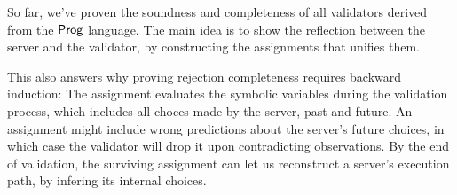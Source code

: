 So far, we've proven the soundness and completeness of all validators derived
from the $\mathsf{Prog}$ language.  The main idea is to show the reflection between the
server and the validator, by constructing the assignments that unifies them.

This also answers why proving rejection completeness requires backward
induction: The assignment evaluates the symbolic variables during the validation
process, which includes all choces made by the server, past and future.  An
assignment might include wrong predictions about the server's future choices, in
which case the validator will drop it upon contradicting observations.  By the
end of validation, the surviving assignment can let us reconstruct a server's
execution path, by infering its internal choices.
